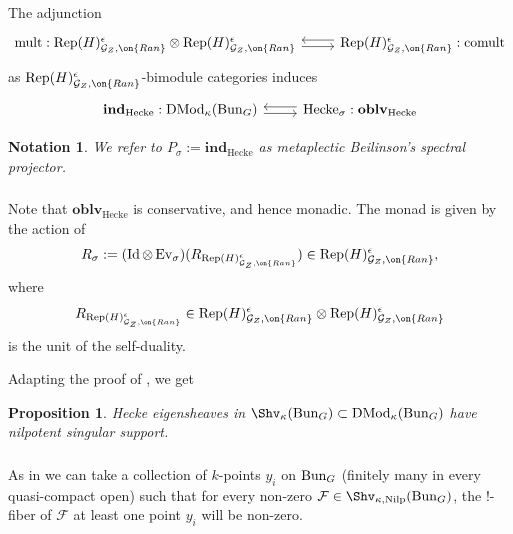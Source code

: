 \documentclass[9pt]{amsart}
\newcommand{\cF}{{\mathcal F}}
\newcommand{\cG}{{\mathcal G}}
\newcommand{\Ranp}{{\on{Ran}}}
\DeclareMathOperator{\Id}{{Id}}
\DeclareMathOperator{\Nilp}{{Nilp}} \DeclareMathOperator{\op}{{op}}
\DeclareMathOperator{\Rep}{{Rep}}
\newtheorem{pr}[subsubsection]{Proposition}
\newtheorem{ntn}[subsubsection]{Notation}
\numberwithin{equation}{section}
\DeclareMathOperator{\D}{{DMod}}
\begin{document}
The adjunction
\begin{equation}
\begin{tikzcd}
{\operatorname{mult}}: \Rep(H)_{\cG_Z, \Ranp}^{\epsilon} \otimes \Rep(H)_{\cG_Z, \Ranp}^{\epsilon} \ar[r, rightarrow,  shift right, ""]& \arrow[l,  shift right, ""]\Rep(H)_{\cG_Z, \Ranp}^{\epsilon}: {\operatorname{comult}}
\end{tikzcd}
\end{equation}
as $\Rep(H)_{\cG_Z, \Ranp}^{\epsilon}$-bimodule categories induces
\begin{equation}
\begin{tikzcd}
\mathbf{ind}_{\operatorname{Hecke}}: \D_{\kappa}(\Bun_G) \ar[r, rightarrow,  shift right, ""]& \arrow[l,  shift right, ""]\operatorname{Hecke}_{\sigma}: \mathbf{oblv}_{\operatorname{Hecke}}
\end{tikzcd}
\end{equation}
\begin{ntn}
	We refer to $P_{\sigma}:= \mathbf{ind}_{\operatorname{Hecke}}$ as \emph{metaplectic Beilinson's spectral projector}.
\end{ntn}

\subsubsection{} Note that  $\mathbf{oblv}_{\operatorname{Hecke}}$ is conservative, and hence monadic. The monad is given by the action of 
\begin{equation}
	R_{\sigma}:= (\Id \otimes \operatorname{Ev}_{\sigma})(R_{\Rep(H)_{\cG_Z, \Ranp}^{\epsilon}}) \in \Rep(H)_{\cG_Z, \Ranp}^{\epsilon},
\end{equation}
where $$R_{\Rep(H)_{\cG_Z, \Ranp}^{\epsilon}}\in \Rep(H)_{\cG_Z, \Ranp}^{\epsilon} \otimes \Rep(H)_{\cG_Z, \Ranp}^{\epsilon}$$ is the unit of the self-duality.

Adapting the proof of \cite[Main Theorem 14.4.4]{AGKRRV}, we get 
\begin{pr}\cite[Corollary 14.4.10]{AGKRRV}\label{nilpss}
	Hecke eigensheaves in $\Shv_{\kappa}(\Bun_G) \subset \D_{\kappa}(\Bun_G)$ have nilpotent singular support.
\end{pr}

\subsubsection{} As in \cite[16.2.1]{AGKRRV} we can take a collection of $k$-points $y_i$ on $\operatorname{{Bun}}_G$ (finitely many in every quasi-compact open) such that for every non-zero $\cF \in \Shv_{\kappa, \Nilp}(\Bun_G)$, the $!$-fiber of $\cF$ at least one point $y_i$ will be non-zero. 
\end{document}
